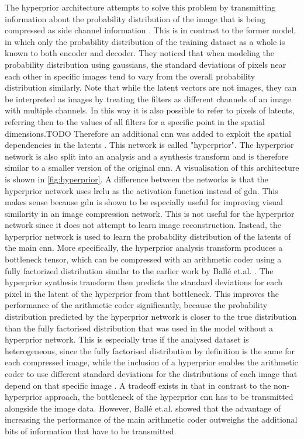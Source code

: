 The hyperprior architecture attempts to solve this problem by transmitting information about the probability distribution of the image that is being compressed as side channel information \citep{balle_variational_2018}. This is in contrast to the former model, in which only the probability distribution of the training dataset as a whole is known to both encoder and decoder. They noticed that when modeling the probability distribution using gaussians, the standard deviations of pixels near each other in specific images tend to vary from the overall probability distribution similarly. Note that while the latent vectors are not images, they can be interpreted as images by treating the filters as different channels of an image with multiple channels. In this way it is also possible to refer to pixels of latents, referring then to the values of all filters for a specific point in the spatial dimensions.TODO  Therefore an additional \ac{cnn} was added to exploit the spatial dependencies in the latents \citep{balle_variational_2018}. This network is called "hyperprior". The hyperprior network is also split into an analysis and a synthesis transform and is therefore similar to a smaller version of the original \ac{cnn}. A visualisation of this architecture is shown in \autoref{fig:hyperprior}. A difference between the networks is that the hyperprior network uses \ac{lrelu} as the activation function instead of \ac{gdn}. This makes sense because \ac{gdn} is shown to be especially useful for improving visual similarity in an image compression network. This is not useful for the hyperprior network since it does not attempt to learn image reconstruction. Instead, the hyperprior network is used to learn the probability distribution of the latents of the main \ac{cnn}. More specifically, the hyperprior analysis transform produces a bottleneck tensor, which can be compressed with an arithmetic coder using a fully factorized distribution similar to the earlier work by Ballé et.al. \citep{balle_end--end_2017}. The hyperprior synthesis transform then predicts the standard deviations for each pixel in the latent of the hyperprior from that bottleneck. This improves the performance of the arithmetic coder significantly, because the probability distribution predicted by the hyperprior network is closer to the true distribution than the fully factorised distribution that was used in the model without a hyperprior network. This is especially true if the analysed dataset is heterogeneous, since the fully factorised distribution by definition is the same for each compressed image, while the inclusion of a hyperprior enables the arithmetic coder to use different standard deviations for the distributions of each image that depend on that specific image \citep{balle_variational_2018}. A tradeoff exists in that in contrast to the non-hyperprior approach, the bottleneck of the hyperprior \ac{cnn} has to be transmitted alongside the image data. However, Ballé et.al. \citep{balle_variational_2018} showed that the advantage of increasing the performance of the main arithmetic coder outweighs the additional bits of information that have to be transmitted.

